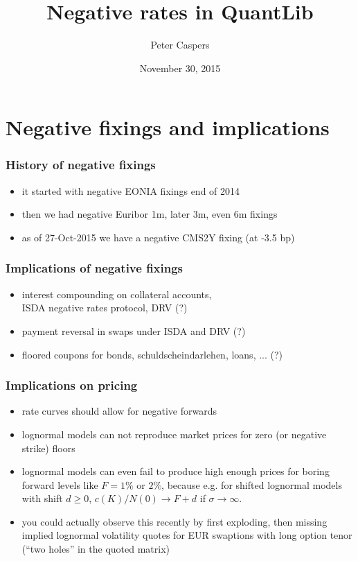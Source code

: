 \documentclass{beamer}
\begin{document}
\title{Negative rates in QuantLib}
\author{Peter Caspers}
\date{November 30, 2015}

\frame{\titlepage}


\section{Negative fixings and implications}

\begin{frame}[fragile]
\frametitle{History of negative fixings}
\begin{itemize}
\item it started with negative EONIA fixings end of 2014
\item then we had negative Euribor 1m, later 3m, even 6m fixings
\item as of 27-Oct-2015 we have a negative CMS2Y fixing (at -3.5 bp)
\end{itemize}
\end{frame}

\begin{frame}[fragile]
\frametitle{Implications of negative fixings}
\begin{itemize}
\item interest compounding on collateral accounts,\\
ISDA negative rates protocol, DRV (?)
\item payment reversal in swaps under ISDA and DRV (?)
\item floored coupons for bonds, schuldscheindarlehen, loans, ... (?)
\end{itemize}
\end{frame}

\begin{frame}[fragile]
\frametitle{Implications on pricing}
\begin{itemize}
\item rate curves should allow for negative forwards
\item lognormal models can not reproduce market prices for zero (or negative strike) floors
\item lognormal models can even fail to produce high enough prices for boring forward levels like $F=1\%$ or $2\%$, because e.g. for shifted lognormal models with shift $d\geq0$, $c(K)/N(0)\rightarrow F+d$ if $\sigma\rightarrow\infty$. 
\item you could actually observe this recently by first exploding, then missing implied lognormal volatility quotes for EUR swaptions with long option tenor (``two holes'' in the quoted matrix)
\end{itemize}
\end{frame}
\end{document}
